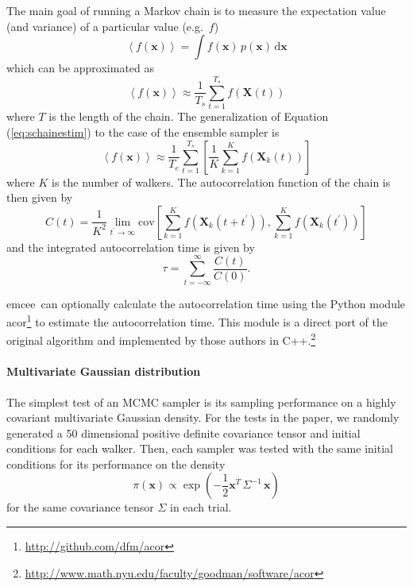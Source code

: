 \documentclass[12pt,preprint]{aastex}
\newcommand{\project}[1]{{\sffamily #1}}
\newcommand{\thisplain}{emcee}
\newcommand{\this}{\project{\thisplain}}
\newcommand{\eq}[1]{Equation (\ref{eq:#1})}
\newcommand{\eqlabel}[1]{\label{eq:#1}}
\newcommand{\dd}{\mathrm{d}}
\begin{document}
The main goal of running a Markov chain is to measure the expectation value
(and variance) of a particular value (e.g.~$f$)
\begin{equation}
    \left < f(\mathbf{x}) \right > = \int f(\mathbf{x}) \, p (\mathbf{x}) \,
            \dd \mathbf{x}
\end{equation}
which can be approximated as
\begin{equation}
    \eqlabel{schainestim}
    \left < f(\mathbf{x}) \right > \approx \frac{1}{T_s} \sum_{t=1}^{T_s}
            f(\mathbf{X}(t))
\end{equation}
where $T$ is the length of the chain.  The generalization of \eq{schainestim}
to the case of the ensemble sampler is
\begin{equation}
    \eqlabel{echainestim}
    \left < f(\mathbf{x}) \right > \approx \frac{1}{T_e} \sum_{t=1}^{T_s}
        \left [ \frac{1}{K} \sum_{k = 1}^{K} f(\mathbf{X}_k(t)) \right ]
\end{equation}
where $K$ is the number of walkers.  The autocorrelation function of the chain
is then given by
\begin{equation}
    C (t) = \frac{1}{K^2} \lim_{t^\prime \to \infty} \mathrm{cov}
            \left [ \sum_{k = 1}^{K} f(\mathbf{X}_k (t+t^\prime)),
            \sum_{k = 1}^{K} f(\mathbf{X}_k (t^\prime)) \right ]
\end{equation}
and the integrated autocorrelation time is given by
\begin{equation}
    \tau = \sum_{t= -\infty} ^{\infty} \frac{C(t)}{C(0)} .
\end{equation}

\this~can optionally calculate the autocorrelation time using the Python
module \project{acor}\footnote{\url{http://github.com/dfm/acor}} to estimate
the autocorrelation time. This module is a direct port of the original
algorithm  and implemented by those
authors in
C++.\footnote{\url{http://www.math.nyu.edu/faculty/goodman/software/acor}}

\paragraph{Multivariate Gaussian distribution}

The simplest test of an MCMC sampler is its sampling performance on a highly
covariant multivariate Gaussian density. For the tests in the paper, we
randomly generated a 50 dimensional positive definite covariance tensor and
initial conditions for each walker. Then, each sampler was tested with the
same initial conditions for its performance on the density
\begin{equation}
    \pi (\mathbf{x}) \propto \exp\left ( -\frac{1}{2} \mathbf{x}^T \,
                                \Sigma^{-1} \, \mathbf{x} \right )
\end{equation}
for the same covariance tensor $\Sigma$ in each trial.
\end{document}

